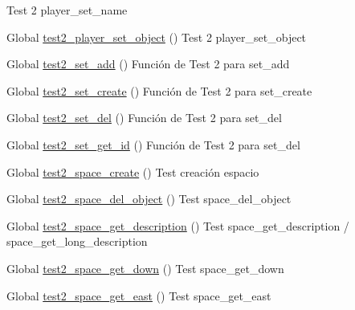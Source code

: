 \begin{DoxyRefList}
%
Test 2 player\+\_\+set\+\_\+name  
\item[Global \mbox{\hyperlink{player__test_8c_a9e7db6b857907187146df64abd16aca5}{test2\+\_\+player\+\_\+set\+\_\+object}} ()]\label{test__test000139}%
%
Test 2 player\+\_\+set\+\_\+object  
\item[Global \mbox{\hyperlink{set__test_8c_ab09827322a313bf97b9757c98c2bdbb0}{test2\+\_\+set\+\_\+add}} ()]\label{test__test000145}%
%
Función de Test 2 para set\+\_\+add  
\item[Global \mbox{\hyperlink{set__test_8c_abed3d273788e23fc31ae7f5ed59277b9}{test2\+\_\+set\+\_\+create}} ()]\label{test__test000143}%
%
Función de Test 2 para set\+\_\+create  
\item[Global \mbox{\hyperlink{set__test_8c_a4e8b8663f067122ea82b83e2d07e685c}{test2\+\_\+set\+\_\+del}} ()]\label{test__test000147}%
%
Función de Test 2 para set\+\_\+del  
\item[Global \mbox{\hyperlink{set__test_8c_a665b83794eafe832cc4d71aa42dc016d}{test2\+\_\+set\+\_\+get\+\_\+id}} ()]\label{test__test000149}%
%
Función de Test 2 para set\+\_\+del  
\item[Global \mbox{\hyperlink{space__test_8c_a012cd3cf37a8d91e2d7098a264c29d65}{test2\+\_\+space\+\_\+create}} ()]\label{test__test000151}%
%
Test creación espacio  
\item[Global \mbox{\hyperlink{space__test_8c_a5727fc65ee0f976061f63d2bfd7e95fe}{test2\+\_\+space\+\_\+del\+\_\+object}} ()]\label{test__test000178}%
%
Test space\+\_\+del\+\_\+object  
\item[Global \mbox{\hyperlink{space__test_8c_aebfa57e927e8f871e73425975c11976b}{test2\+\_\+space\+\_\+get\+\_\+description}} ()]\label{test__test000188}%
%
Test space\+\_\+get\+\_\+description / space\+\_\+get\+\_\+long\+\_\+description  
\item[Global \mbox{\hyperlink{space__test_8c_a4390a534575e1516d30140e8e40e3b52}{test2\+\_\+space\+\_\+get\+\_\+down}} ()]\label{test__test000200}%
%
Test space\+\_\+get\+\_\+down  
\item[Global \mbox{\hyperlink{space__test_8c_a249293510e61c6d5465f52c14343d02b}{test2\+\_\+space\+\_\+get\+\_\+east}} ()]\label{test__test000170}%
%
Test space\+\_\+get\+\_\+east  

\end{DoxyRefList}
